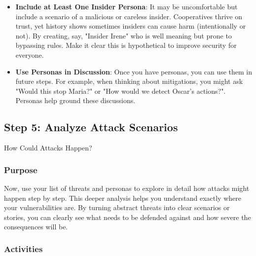 \begin{itemize}
    \item \textbf{Include at Least One Insider Persona}: It may be uncomfortable but include a scenario of
    a malicious or careless insider. Cooperatives thrive on trust, yet history shows sometimes insiders
    can cause harm (intentionally or not). By creating, say, "Insider Irene" who is well meaning but
    prone to bypassing rules. Make it clear this is hypothetical to improve security for everyone.
    
    \item \textbf{Use Personas in Discussion}: Once you have personas, you can use them in future steps.
    For example, when thinking about mitigations, you might ask "Would this stop Maria?" or
    "How would we detect Oscar's actions?". Personas help ground these discussions.

\end{itemize}

\subsection{Step 5: Analyze Attack Scenarios}
\label{subsec:Step5}

How Could Attacks Happen?

\subsubsection{Purpose}

Now, use your list of threats and personas to explore in detail how attacks
might happen step by step. This deeper analysis helps you understand exactly
where your vulnerabilities are. By turning abstract threats into clear scenarios
or stories, you can clearly see what needs to be defended against and how severe
the consequences will be.

\subsubsection{Activities}

